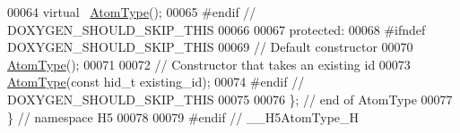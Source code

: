 \begin{DoxyCode}
00064         \textcolor{keyword}{virtual} ~\hyperlink{class_h5_1_1_atom_type}{AtomType}();
00065 \textcolor{preprocessor}{#endif // DOXYGEN\_SHOULD\_SKIP\_THIS}
00066 
00067    \textcolor{keyword}{protected}:
00068 \textcolor{preprocessor}{#ifndef DOXYGEN\_SHOULD\_SKIP\_THIS}
00069         \textcolor{comment}{// Default constructor}
00070         \hyperlink{class_h5_1_1_atom_type}{AtomType}();
00071 
00072         \textcolor{comment}{// Constructor that takes an existing id}
00073         \hyperlink{class_h5_1_1_atom_type}{AtomType}(\textcolor{keyword}{const} hid\_t existing\_id);
00074 \textcolor{preprocessor}{#endif // DOXYGEN\_SHOULD\_SKIP\_THIS}
00075 
00076 \}; \textcolor{comment}{// end of AtomType}
00077 \} \textcolor{comment}{// namespace H5}
00078 
00079 \textcolor{preprocessor}{#endif // \_\_H5AtomType\_H}
\end{DoxyCode}
